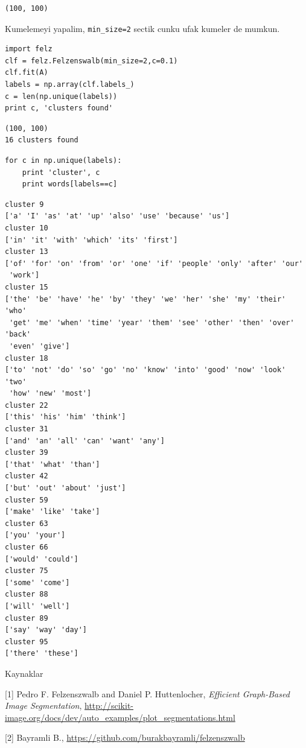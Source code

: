 \documentclass[12pt,fleqn]{article}\usepackage{../common}
\begin{document}
\begin{verbatim}
(100, 100)
\end{verbatim}

Kumelemeyi yapalim, \verb!min_size=2! sectik cunku ufak kumeler de mumkun.

\begin{verbatim}
import felz
clf = felz.Felzenswalb(min_size=2,c=0.1)
clf.fit(A)
labels = np.array(clf.labels_)
c = len(np.unique(labels))
print c, 'clusters found'
\end{verbatim}

\begin{verbatim}
(100, 100)
16 clusters found
\end{verbatim}

\begin{verbatim}
for c in np.unique(labels):
    print 'cluster', c
    print words[labels==c]
\end{verbatim}

\begin{verbatim}
cluster 9
['a' 'I' 'as' 'at' 'up' 'also' 'use' 'because' 'us']
cluster 10
['in' 'it' 'with' 'which' 'its' 'first']
cluster 13
['of' 'for' 'on' 'from' 'or' 'one' 'if' 'people' 'only' 'after' 'our'
 'work']
cluster 15
['the' 'be' 'have' 'he' 'by' 'they' 'we' 'her' 'she' 'my' 'their' 'who'
 'get' 'me' 'when' 'time' 'year' 'them' 'see' 'other' 'then' 'over' 'back'
 'even' 'give']
cluster 18
['to' 'not' 'do' 'so' 'go' 'no' 'know' 'into' 'good' 'now' 'look' 'two'
 'how' 'new' 'most']
cluster 22
['this' 'his' 'him' 'think']
cluster 31
['and' 'an' 'all' 'can' 'want' 'any']
cluster 39
['that' 'what' 'than']
cluster 42
['but' 'out' 'about' 'just']
cluster 59
['make' 'like' 'take']
cluster 63
['you' 'your']
cluster 66
['would' 'could']
cluster 75
['some' 'come']
cluster 88
['will' 'well']
cluster 89
['say' 'way' 'day']
cluster 95
['there' 'these']
\end{verbatim}






Kaynaklar

[1] Pedro F. Felzenszwalb and Daniel P. Huttenlocher, {\em Efficient
  Graph-Based Image Segmentation},
\url{http://scikit-image.org/docs/dev/auto_examples/plot_segmentations.html}

[2] Bayramli B., \url{https://github.com/burakbayramli/felzenszwalb}
\end{document}
